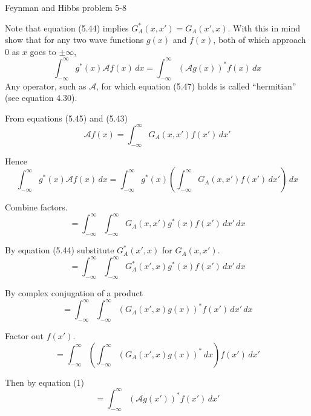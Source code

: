 \documentclass[12pt]{article}
\begin{document}
\begin{center}
Feynman and Hibbs problem 5-8
\end{center}

Note that equation (5.44) implies $G_A^*(x,x')=G_A(x',x)$.
With this in mind show that for any two wave functions
$g(x)$ and $f(x)$, both of which approach 0 as $x$ goes to $\pm\infty$,
\begin{equation*}
\int_{-\infty}^\infty
g^*(x)\mathcal Af(x)\,dx=
\int_{-\infty}^\infty
(\mathcal Ag(x))^*f(x)\,dx
\tag{5.47}
\end{equation*}
Any operator, such as $\mathcal A$, for which equation (5.47)
holds is called ``hermitian'' (see equation 4.30).

\bigskip
From equations (5.45) and (5.43)
\begin{equation*}
\mathcal Af(x)=\int_{-\infty}^\infty G_A(x,x')f(x')\,dx'
\tag{1}
\end{equation*}

Hence
\begin{equation*}
\int_{-\infty}^\infty g^*(x)\mathcal Af(x)\,dx
=\int_{-\infty}^\infty g^*(x)
\left(\int_{-\infty}^\infty G_A(x,x')f(x')\,dx'\right)
\,dx
\end{equation*}

Combine factors.
\begin{equation*}
{}=\int_{-\infty}^\infty
\int_{-\infty}^\infty G_A(x,x')g^*(x)f(x')\,dx'
\,dx
\end{equation*}

By equation (5.44) substitute $G_A^*(x',x)$ for $G_A(x,x')$.
\begin{equation*}
{}=\int_{-\infty}^\infty
\int_{-\infty}^\infty G_A^*(x',x)g^*(x)f(x')\,dx'
\,dx
\end{equation*}

By complex conjugation of a product
\begin{equation*}
{}=\int_{-\infty}^\infty
\int_{-\infty}^\infty(G_A(x',x)g(x))^*f(x')\,dx'
\,dx
\end{equation*}

Factor out $f(x')$.
\begin{equation*}
{}=\int_{-\infty}^\infty
\left(\int_{-\infty}^\infty(G_A(x',x)g(x))^*\,dx\right)f(x')\,dx'
\end{equation*}

Then by equation (1)
\begin{equation*}
{}=\int_{-\infty}^\infty (\mathcal Ag(x'))^*f(x')\,dx'
\end{equation*}
\end{document}
